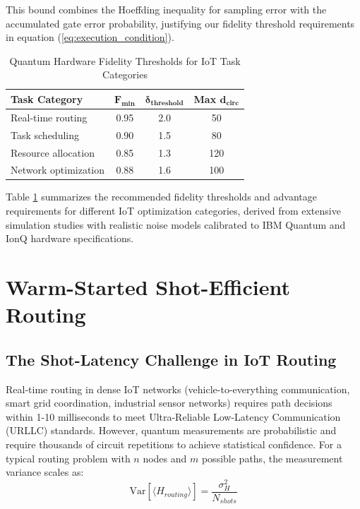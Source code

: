 \documentclass[lettersize,journal]{IEEEtran}
\begin{document}
This bound combines the Hoeffding inequality for sampling error with the accumulated gate error probability, justifying our fidelity threshold requirements in equation (\ref{eq:execution_condition}).

\begin{table}[t]
\caption{Quantum Hardware Fidelity Thresholds for IoT Task Categories}
\label{tab:fidelity_thresholds}
\centering
\small
\begin{tabular}{lccc}
\hline
\textbf{Task Category} & \textbf{$\boldsymbol{F_{min}}$} & \textbf{$\boldsymbol{\delta_{threshold}}$} & \textbf{Max $\boldsymbol{d_{circ}}$} \\ \hline
Real-time routing & 0.95 & 2.0 & 50 \\
Task scheduling & 0.90 & 1.5 & 80 \\
Resource allocation & 0.85 & 1.3 & 120 \\
Network optimization & 0.88 & 1.6 & 100 \\ \hline
\end{tabular}
\end{table}

Table \ref{tab:fidelity_thresholds} summarizes the recommended fidelity thresholds and advantage requirements for different IoT optimization categories, derived from extensive simulation studies with realistic noise models calibrated to IBM Quantum and IonQ hardware specifications.

\section{Warm-Started Shot-Efficient Routing}
\label{sec:warm_routing}


\subsection{The Shot-Latency Challenge in IoT Routing}
\label{subsec:shot_challenge}

Real-time routing in dense IoT networks (vehicle-to-everything communication, smart grid coordination, industrial sensor networks) requires path decisions within 1-10 milliseconds to meet Ultra-Reliable Low-Latency Communication (URLLC) standards. However, quantum measurements are probabilistic and require thousands of circuit repetitions to achieve statistical confidence. For a typical routing problem with $n$ nodes and $m$ possible paths, the measurement variance scales as:
\begin{equation}
\text{Var}[\langle \hat{H}_{routing} \rangle] = \frac{\sigma^2_H}{N_{shots}}
\label{eq:measurement_variance}
\end{equation}
\end{document}
